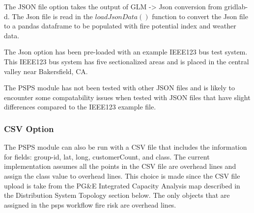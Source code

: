 \documentclass{article}
\begin{document}
The JSON file option takes the output of GLM -> Json conversion from gridlab-d. The Json file is read in the $loadJsonData()$ function to convert the Json file to a pandas dataframe to be populated with fire potential index and weather data.  



The Json option has been pre-loaded with an example IEEE123 bus test system. This IEEE123 bus system has five sectionalized areas and is placed in the central valley near Bakersfield, CA. 

The PSPS module has not been tested with other JSON files and is likely to encounter some compatability issues when tested with JSON files that have slight differences compared to the IEEE123 example file.

\subsubsection{CSV Option}
 The PSPS module can also be run with a CSV file that includes the information for fields: group-id, lat, long, customerCount, and class. The current implementation assumes all the points in the CSV file are overhead lines and assign the class value to overhead lines. This choice is made since the CSV file upload is take from the PG&E Integrated Capacity Analysis map described in the Distribution System Topology section below. The only objects that are assigned in the psps workflow fire risk are overhead lines. 
 
\end{document}
